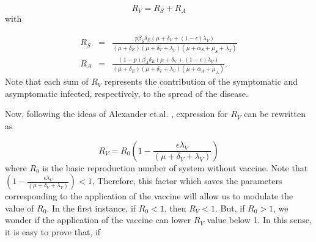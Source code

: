 



\begin{equation}\label{Rv}
R_{V}=R_S+R_A
\end{equation}
with

\begin{eqnarray*}
R_S&=&\frac{p\beta_S\delta_E(\mu+\delta_V+(1-\epsilon) \lambda_V)}{(\mu+\delta_E)(\mu+\delta_V+\lambda_V)(\mu+\alpha_S+\mu_S+\lambda_T)}\\ 
 R_A&=&\frac{(1-p)\beta_A\delta_E(\mu+\delta_V+(1-\epsilon) \lambda_V)}{(\mu+\delta_E)(\mu+\delta_V+\lambda_V)(\mu+\alpha_A+\mu_A)}.\nonumber
\end{eqnarray*}
 Note that each sum of $ R_ {V} $ represents the contribution of the symptomatic and asymptomatic infected, respectively, to the spread of the disease.

Now, following the ideas of Alexander et.al. \cite{Alexander2004}, expression for $R_V$ can be rewritten as

\begin{equation}\label{Rv2}
R_{V}=R_0\left(1- \frac{\epsilon \lambda_V}{(\mu+\delta_V+\lambda_V)}\right)
\end{equation}
where $R_0$ is the basic reproduction number of system without vaccine. Note that $\left(1- \frac{\epsilon \lambda_V}{(\mu+\delta_V+\lambda_V)}\right)<1$, Therefore, this factor which saves the parameters corresponding to the application of the vaccine will allow us to modulate the value of $ R_0 $. In the first instance, if $ R_0 <1 $, then $ R_V <1 $. But, if $ R_0> 1 $, we wonder if the application of the vaccine can lower $R_V$ value below 1. In this sense, it is easy to prove that, if

